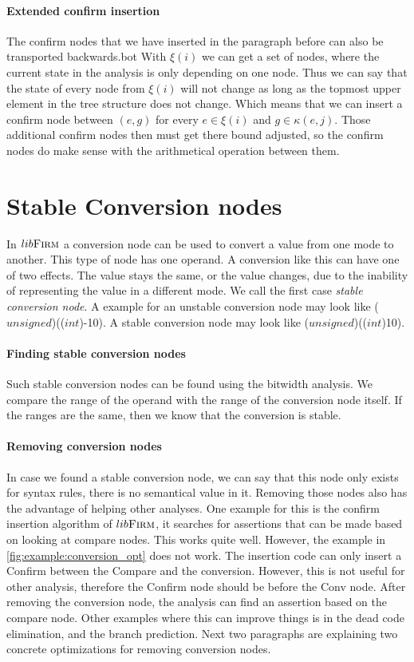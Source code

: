 \paragraph{Extended confirm insertion}
The confirm nodes that we have inserted in the paragraph before can also be transported backwards.bot
With $\xi(i)$ we can get a set of nodes, where the current state in the analysis is only depending on one node. Thus we can say that the state of every node from $\xi(i)$ will not change as long as the topmost upper element in the tree structure does not change. Which means that we can insert a confirm node between $(e,g)$ for every $e \in \xi(i)$ and $g \in \kappa(e, j)$. Those additional confirm nodes then must get there bound adjusted, so the confirm nodes do make sense with the arithmetical operation between them.

\section{Stable Conversion nodes}
In $lib\textsc{Firm}$ a conversion node can be used to convert a value from one mode to another. This type of node has one operand. A conversion like this can have one of two effects. The value stays the same, or the value changes, due to the inability of representing the value in a different mode. We call the first case \textit{stable conversion node}. A example for an unstable conversion node may look like ($unsigned$)(($int$)-10). A stable conversion node may look like ($unsigned$)(($int$)10).

\paragraph{Finding stable conversion nodes}
Such stable conversion nodes can be found using the bitwidth analysis. We compare the range of the operand with the range of the conversion node itself. If the ranges are the same, then we know that the conversion is stable.

\paragraph{Removing conversion nodes}

In case we found a stable conversion node, we can say that this node only exists for syntax rules, there is no semantical value in it. Removing those nodes also has the advantage of helping other analyses. \newline
One example for this is the confirm insertion algorithm of $lib\textsc{Firm}$, it searches for assertions that can be made based on looking at compare nodes. This works quite well. However, the example in \autoref{fig:example:conversion_opt} does not work. The insertion code can only insert a Confirm between the Compare and the conversion. However, this is not useful for other analysis, therefore the Confirm node should be before the Conv node.
After removing the conversion node, the analysis can find an assertion based on the compare node. Other examples where this can improve things is in the dead code elimination, and the branch prediction. Next two paragraphs are explaining two concrete optimizations for removing conversion nodes.

